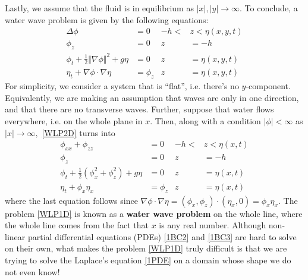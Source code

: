 \documentclass[10pt,reqno,oneside,a4paper]{article}
\begin{document}
Lastly, we assume that the fluid is in equilibrium as $|x|, |y| \to \infty.$ To conclude, a water wave problem is given by the following equations:
\begin{subequations}\label{WLP2D}
\begin{align}
\label{2PDE} \Delta \phi &= 0  &-h <&z < \eta(x,y,t) \\
\label{2BC1} \phi_z &= 0 &z &= -h  \\ 
\label{2BC2} \phi_t + \frac{1}{2} \Vert \nabla \phi \Vert^2 + g \eta &= 0 &z &= \eta(x,y,t)\\
\label{2BC3} \eta_t + \nabla \phi \cdot \nabla \eta &= \phi_z &z &= \eta(x,y,t)
\end{align}
\end{subequations}
For simplicity, we consider a system that is ``flat'', i.e. there's no $y$-component. Equivalently, we are making an assumption that waves are only in one direction, and that there are no transverse waves. Further, suppose that water flows everywhere, i.e. on the whole plane in $x$. Then, along with a condition $|\phi| < \infty$ as $|x| \to \infty,$ \eqref{WLP2D} turns into 
\begin{subequations}\label{WLP1D}
\begin{align}
\label{1PDE} \phi_{xx} + \phi_{zz} &= 0  &-h <&z < \eta(x,t) \\
\label{1BC1} \phi_z &= 0 &z &= -h  \\ 
\label{1BC2} \phi_t + \frac{1}{2} (\phi_{x}^2 + \phi_{z}^2) + g \eta &= 0 &z &= \eta(x,t)\\
\label{1BC3}  \eta_t + \phi_x\eta_x &=\phi_z &z &= \eta(x,t)
\end{align}
\end{subequations}
where the last equation follows since $\nabla \phi \cdot \nabla \eta = (\phi_x, \phi_z) \cdot (\eta_x, 0) = \phi_x\eta_x.$ The problem \eqref{WLP1D} is known as a \textbf{water wave problem} on the whole line, where the whole line comes from the fact that $x$ is any real number. Although non-linear partial differential equations (PDEs) \eqref{1BC2} and \eqref{1BC3} are hard to solve on their own, what makes the problem \eqref{WLP1D} truly difficult is that we are trying to solve the Laplace's equation \eqref{1PDE} on a domain whose shape we do not even know!

\end{document}
